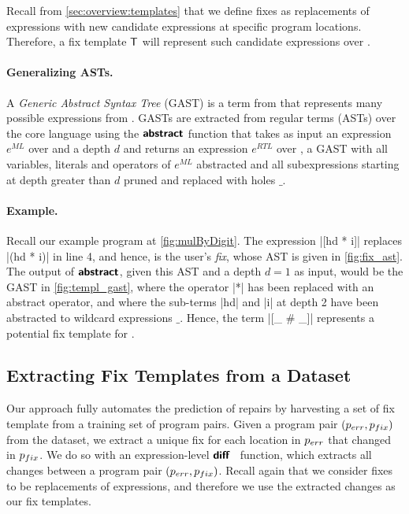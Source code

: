 Recall from \autoref{sec:overview:templates} that we define fixes as
replacements of expressions with new candidate expressions at specific program
locations. Therefore, a fix template $\mathsf{T}$ will represent such candidate
expressions over \repairLang.

\paragraph{Generalizing ASTs.}
A \emph{Generic Abstract Syntax Tree} (GAST) is a term from \repairLang that
represents many possible expressions from \lang. GASTs are extracted from
regular terms (ASTs) over the core language \lang using the $\bm{\mathsf{abstract}}$ function
that takes as input an expression $e^{ML}$ over \lang and a depth $d$ and
returns an expression $e^{RTL}$ over \repairLang, \ie a GAST with all variables,
literals and operators of $e^{ML}$ abstracted and all subexpressions starting at
depth greater than $d$ pruned and replaced with holes $\_$.



\paragraph{Example.}
Recall our example program \mbd at \autoref{fig:mulByDigit}.
%
The expression |[hd * i]| replaces |(hd * i)| in line 4, and hence, is the
user's \emph{fix}, whose AST is given in \autoref{fig:fix_ast}.
%
The output of $\bm{\mathsf{abstract}}$, given this AST and a depth $d = 1$ as input, would be
the GAST in \autoref{fig:templ_gast}, where the operator |*| has been replaced
with an abstract operator, and where the sub-terms |hd| and |i| at depth 2 have
been abstracted to wildcard expressions $\_$.
%
Hence, the \repairLang term |[_ # _]| represents a potential fix template for
\mbd.

\subsection{Extracting Fix Templates from a Dataset}
\label{sec:templ-cluster:templates}

Our approach fully automates the prediction of repairs by harvesting a set of
fix template from a training set of program pairs.
%
Given a program pair $(p_{err}, p_{fix})$ from the dataset, we extract a unique fix
for each location in $p_{err}$ that changed in $p_{fix}$.
%
We do so with an expression-level $\bm{\mathsf{diff}}$~\citep{Lempsink2009-xf} function,
which extracts all changes between a program pair $(p_{err}, p_{fix})$.
%
Recall again that we consider fixes to be replacements of expressions, and
therefore we use the extracted changes as our fix templates.

